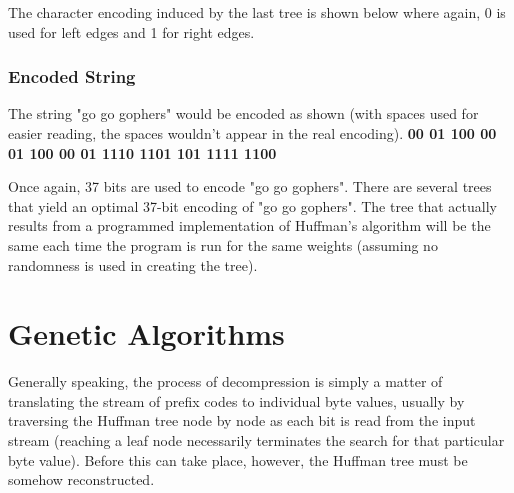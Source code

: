 \documentclass[12pt]{report}
\begin{document}
The character encoding induced by the last tree is shown below where again, 0 is used for left edges and 1 for right edges.

\begin{figure}[h!]
	\centering
\end{figure}

\subsection{Encoded String}

The string "go go gophers" would be encoded as shown (with spaces used for easier reading, the spaces wouldn't appear in the real encoding).
\textbf{00 01 100 00 01 100 00 01 1110 1101 101 1111 1100}

Once again, 37 bits are used to encode "go go gophers". There are several trees that yield an optimal 37-bit encoding of "go go gophers". The tree that actually results from a programmed implementation of Huffman's algorithm will be the same each time the program is run for the same weights (assuming no randomness is used in creating the tree).



\pagestyle{fancy}
\chead{}
\rfoot{\small{\thepage}}
\renewcommand{\headrulewidth}{0.4pt}
\renewcommand{\footrulewidth}{0.4pt}













\chapter{Genetic Algorithms}

Generally speaking, the process of decompression is simply a matter of translating the stream of prefix codes to individual byte values, usually by traversing the Huffman tree node by node as each bit is read from the input stream (reaching a leaf node necessarily terminates the search for that particular byte value). Before this can take place, however, the Huffman tree must be somehow reconstructed.
\end{document}
